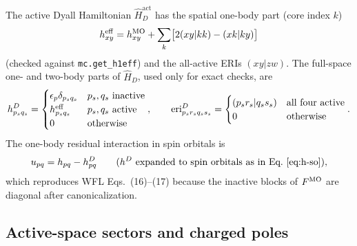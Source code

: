 \documentclass[11pt,a4paper]{article}
\newcommand{\code}[1]{\texttt{#1}}
\newcommand{\act}{\mathrm{act}}
\begin{document}
The active Dyall Hamiltonian $\hat H^{\act}_D$ has the spatial one-body part
(core index $k$)
\begin{equation}
  h^{\rm eff}_{xy}=h^{\rm MO}_{xy}+\sum_k\bigl[2(xy|kk)-(xk|ky)\bigr]
  \label{eq:heff}
\end{equation}
(checked against \code{mc.get\_h1eff}) and the all-active ERIs
$(xy|zw)$.  The full-space one- and two-body parts of $\hat H_D$, used only
for exact checks, are
\begin{equation}
  h^{D}_{p_sq_s}=\begin{cases}\epsilon_{p}\delta_{p_sq_s}&p_s,q_s\ \text{inactive}\\
  h^{\rm eff}_{p_sq_s}&p_s,q_s\ \text{active}\\ 0&\text{otherwise}\end{cases},
  \qquad
  \mathrm{eri}^{D}_{p_sr_sq_ss_s}=\begin{cases}(p_sr_s|q_ss_s)&\text{all four active}\\0&\text{otherwise}\end{cases}.
  \label{eq:HD}
\end{equation}
The one-body residual interaction in spin orbitals is
\begin{equation}
  u_{pq}=h_{pq}-h^{D}_{pq}\qquad(h^{D}\ \text{expanded to spin orbitals as in Eq.~\eqref{eq:h-so}}),
  \label{eq:u}
\end{equation}
which reproduces WFL Eqs.~(16)--(17) because the inactive blocks of
$F^{\rm MO}$ are diagonal after canonicalization.

\subsection{Active-space sectors and charged poles}
\label{sec:poles}
\end{document}
